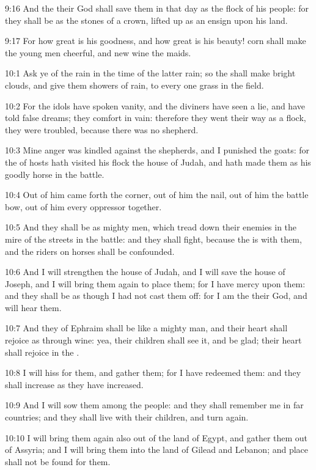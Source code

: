 9:16 And the \LORD their God shall save them in that day as the flock
of his people: for they shall be as the stones of a crown, lifted up
as an ensign upon his land.

9:17 For how great is his goodness, and how great is his beauty! corn
shall make the young men cheerful, and new wine the maids.

10:1 Ask ye of the \LORD rain in the time of the latter rain; so the
\LORD shall make bright clouds, and give them showers of rain, to every
one grass in the field.

10:2 For the idols have spoken vanity, and the diviners have seen a
lie, and have told false dreams; they comfort in vain: therefore they
went their way as a flock, they were troubled, because there was no
shepherd.

10:3 Mine anger was kindled against the shepherds, and I punished the
goats: for the \LORD of hosts hath visited his flock the house of
Judah, and hath made them as his goodly horse in the battle.

10:4 Out of him came forth the corner, out of him the nail, out of him
the battle bow, out of him every oppressor together.

10:5 And they shall be as mighty men, which tread down their enemies
in the mire of the streets in the battle: and they shall fight,
because the \LORD is with them, and the riders on horses shall be
confounded.

10:6 And I will strengthen the house of Judah, and I will save the
house of Joseph, and I will bring them again to place them; for I have
mercy upon them: and they shall be as though I had not cast them off:
for I am the \LORD their God, and will hear them.

10:7 And they of Ephraim shall be like a mighty man, and their heart
shall rejoice as through wine: yea, their children shall see it, and
be glad; their heart shall rejoice in the \LORD.

10:8 I will hiss for them, and gather them; for I have redeemed them:
and they shall increase as they have increased.

10:9 And I will sow them among the people: and they shall remember me
in far countries; and they shall live with their children, and turn
again.

10:10 I will bring them again also out of the land of Egypt, and
gather them out of Assyria; and I will bring them into the land of
Gilead and Lebanon; and place shall not be found for them.

